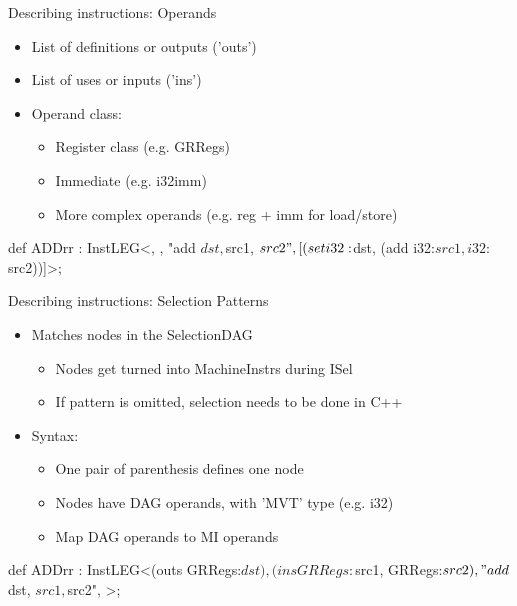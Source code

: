 \begin{frame}[fragile]{Describing instructions: Operands}

\begin{itemize}
    \item List of definitions or outputs ('outs')
    \item List of uses or inputs ('ins')
    \item Operand class:
    \begin{itemize}
        \item Register class (e.g. GRRegs)
        \item Immediate (e.g. i32imm)
        \item More complex operands (e.g. reg + imm for load/store)
    \end{itemize}
\end{itemize}

\begin{codebox}[commandchars=\\\{\}]
def ADDrr : InstLEG<,
                    ,
                    "add $dst, $src1, $src2",
                    [(set i32:$dst, (add i32:$src1, i32:$src2))]>;
\end{codebox}

\end{frame}


\begin{frame}[fragile]{Describing instructions: Selection Patterns}

\begin{itemize}
    \item Matches nodes in the SelectionDAG
    \begin{itemize}
        \item Nodes get turned into MachineInstrs during ISel
        \item If pattern is omitted, selection needs to be done in C++
    \end{itemize}
    \item Syntax:
    \begin{itemize}
        \item One pair of parenthesis defines one node
        \item Nodes have DAG operands, with 'MVT' type (e.g. i32)
        \item Map DAG operands to MI operands
    \end{itemize}
\end{itemize}

\begin{codebox}[commandchars=\\\{\}]
def ADDrr : InstLEG<(outs GRRegs:$dst),
                    (ins GRRegs:$src1, GRRegs:$src2),
                    "add $dst, $src1, $src2",
                    >;
\end{codebox}

\end{frame}

